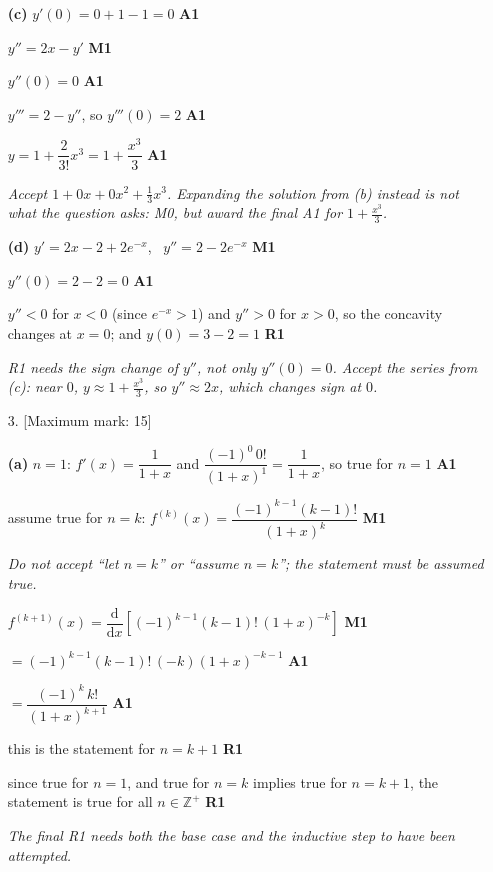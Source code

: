 \documentclass[12pt, twoside]{article}
\begin{document}
\begin{enumerate}[itemsep=0.3cm]
\textbf{(c)} $y'(0) = 0 + 1 - 1 = 0$ \hfill \textbf{A1}

$y'' = 2x - y'$ \hfill \textbf{M1}

$y''(0) = 0$ \hfill \textbf{A1}

$y''' = 2 - y''$, so $y'''(0) = 2$ \hfill \textbf{A1}

$y = 1 + \dfrac{2}{3!}x^{3} = 1 + \dfrac{x^{3}}{3}$ \hfill \textbf{A1}

\emph{Accept $1 + 0x + 0x^{2} + \frac{1}{3}x^{3}$. Expanding the solution
from (b) instead is not what the question asks: M0, but award the final
A1 for $1 + \frac{x^{3}}{3}$.}

\textbf{(d)} $y' = 2x - 2 + 2e^{-x}$, \ $y'' = 2 - 2e^{-x}$ \hfill \textbf{M1}

$y''(0) = 2 - 2 = 0$ \hfill \textbf{A1}

$y'' < 0$ for $x < 0$ (since $e^{-x} > 1$) and $y'' > 0$ for $x > 0$, so
the concavity changes at $x = 0$; and $y(0) = 3 - 2 = 1$ \hfill \textbf{R1}

\emph{R1 needs the sign change of $y''$, not only $y''(0) = 0$. Accept
the series from (c): near $0$, $y \approx 1 + \frac{x^{3}}{3}$, so
$y'' \approx 2x$, which changes sign at $0$.}

\newpage

\item[3.] [Maximum mark: 15]

\textbf{(a)} $n = 1$: $f'(x) = \dfrac{1}{1 + x}$ and
$\dfrac{(-1)^{0}\,0!}{(1 + x)^{1}} = \dfrac{1}{1 + x}$, so true for
$n = 1$ \hfill \textbf{A1}

assume true for $n = k$:
$f^{(k)}(x) = \dfrac{(-1)^{k - 1}(k - 1)!}{(1 + x)^{k}}$ \hfill \textbf{M1}

\emph{Do not accept ``let $n = k$'' or ``assume $n = k$''; the
statement must be assumed true.}

$f^{(k + 1)}(x) = \dfrac{\mathrm{d}}{\mathrm{d}x}
\left[(-1)^{k - 1}(k - 1)!\,(1 + x)^{-k}\right]$ \hfill \textbf{M1}

$= (-1)^{k - 1}(k - 1)!\,(-k)(1 + x)^{-k - 1}$ \hfill \textbf{A1}

$= \dfrac{(-1)^{k}\,k!}{(1 + x)^{k + 1}}$ \hfill \textbf{A1}

this is the statement for $n = k + 1$ \hfill \textbf{R1}

since true for $n = 1$, and true for $n = k$ implies true for
$n = k + 1$, the statement is true for all $n \in \mathbb{Z}^{+}$
\hfill \textbf{R1}

\emph{The final R1 needs both the base case and the inductive step to
have been attempted.}


\end{enumerate}
\end{document}
